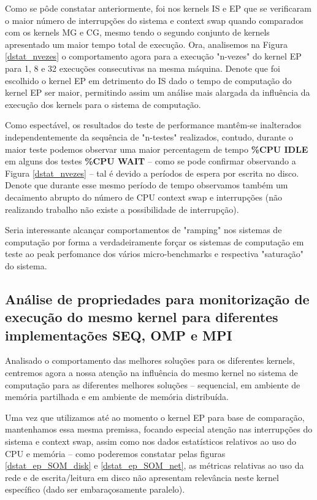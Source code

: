 \documentclass[conference,compsoc]{IEEEtran}
\begin{document}
Como se pôde constatar anteriormente, foi nos kernels IS e EP que se verificaram o maior número de interrupções do sistema e context swap quando comparados com os kernels MG e CG, mesmo tendo o segundo conjunto de kernels apresentado um maior tempo total de execução. Ora, analisemos na Figura \ref{dstat_nvezes}
 o comportamento agora para a execução "n-vezes" do kernel EP para 1, 8 e 32 execuções consecutivas na mesma máquina. Denote que foi escolhido o kernel EP em detrimento do IS dado o tempo de computação do kernel EP ser maior, permitindo assim um análise mais alargada da influência da execução dos kernels para o sistema de computação.\par 
 Como espectável, os resultados do teste de performance mantêm-se inalterados independentemente da sequência de "n-testes" realizados, contudo, durante o maior teste podemos observar uma maior percentagem de tempo \textbf{\%CPU IDLE} em alguns dos testes  \textbf{\%CPU WAIT} -- como se pode confirmar observando a Figura  \ref{dstat_nvezes} --
 tal é devido a períodos de espera por escrita no disco. Denote que durante esse mesmo período de tempo observamos também  um decaimento abrupto do número de CPU context swap e interrupções (não realizando trabalho não existe a possibilidade de interrupção).\par 
 Seria interessante alcançar comportamentos de "ramping" nos sistemas de computação por forma a verdadeiramente forçar os sistemas de computação em teste ao peak perfomance dos vários micro-benchmarks e respectiva "saturação" do sistema.

\subsection{Análise de propriedades para monitorização de execução do mesmo kernel para diferentes implementações SEQ, OMP e MPI}
Analisado o comportamento das melhores soluções para os diferentes kernels, centremos agora a nossa atenção na influência do mesmo kernel no sistema de computação para as diferentes melhores soluções -- sequencial, em ambiente de memória partilhada e em ambiente de memória distribuída. \par
Uma vez que utilizamos até ao momento o kernel EP para base de comparação, mantenhamos essa mesma premissa, focando especial atenção nas interrupções do sistema e context swap, assim como nos dados estatísticos relativos ao uso do CPU e memória -- como poderemos constatar pelas figuras  \ref{dstat_ep_SOM_disk} e \ref{dstat_ep_SOM_net}, as métricas relativas ao uso da rede e de escrita/leitura em disco não apresentam relevância neste kernel específico (dado ser embaraçosamente paralelo).
\end{document}
